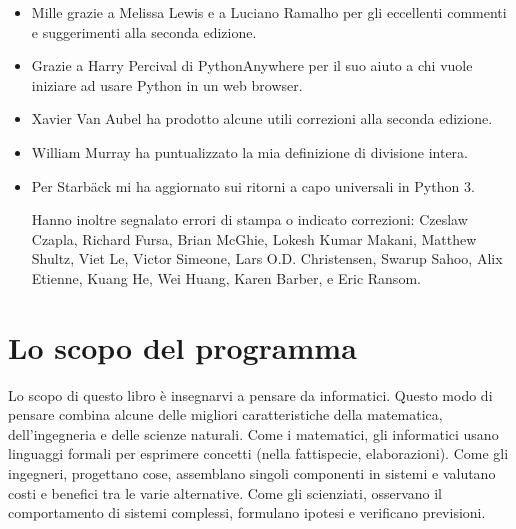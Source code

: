 \documentclass[10pt]{book}
\begin{document}
\begin{itemize}
\item Mille grazie a Melissa Lewis e a Luciano Ramalho per gli eccellenti commenti e suggerimenti alla seconda edizione.

\item Grazie a Harry Percival di PythonAnywhere per il suo aiuto a chi vuole iniziare ad usare Python in un web browser.

\item Xavier Van Aubel ha prodotto alcune utili correzioni alla seconda edizione.

\item William Murray ha puntualizzato la mia definizione di divisione intera.

\item Per Starb{\"a}ck mi ha aggiornato sui ritorni a capo universali in Python 3.


Hanno inoltre segnalato errori di stampa o indicato correzioni:
Czeslaw Czapla, Richard Fursa, Brian McGhie, Lokesh Kumar Makani, Matthew Shultz, Viet Le, Victor Simeone, Lars O.D. Christensen, Swarup Sahoo, Alix Etienne, Kuang He, Wei Huang, Karen Barber, e Eric Ransom.

\end{itemize}

\normalsize
\clearemptydoublepage

\begin{latexonly}

\tableofcontents

\clearemptydoublepage

\end{latexonly}

\mainmatter

\chapter{Lo scopo del programma}

Lo scopo di questo libro è insegnarvi a pensare da informatici. Questo modo di pensare combina alcune delle migliori caratteristiche della matematica, dell'ingegneria e delle scienze naturali. Come i matematici, gli informatici usano linguaggi formali per esprimere concetti (nella fattispecie, elaborazioni). Come gli ingegneri, progettano cose, assemblano singoli componenti in sistemi e valutano costi e benefici tra le varie alternative. Come gli scienziati, osservano il comportamento di sistemi complessi, formulano ipotesi e verificano previsioni.
\end{document}
